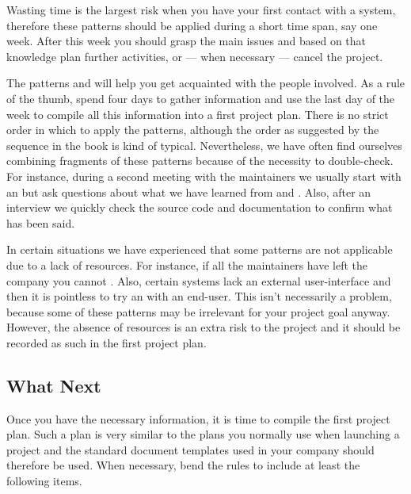 \documentclass[a4paper,10pt,twoside]{book}
\begin{document}
Wasting time is the largest risk when you have your first contact with a system, therefore these patterns should be applied during a short time span, say one week. After this week you should grasp the main issues and based on that knowledge plan further activities, or --- when necessary --- cancel the project.

The patterns  and  will help you get acquainted with the people involved. As a rule of the thumb, spend four days to gather information and use the last day of the week to compile all this information into a first project plan. There is no strict order in which to apply the patterns, although the order as suggested by the sequence in the book is kind of typical. Nevertheless, we have often find ourselves combining fragments of these patterns because of the necessity to double-check. For instance, during a second meeting with the maintainers we usually start with an  but ask questions about what we have learned from  and . Also, after an interview we quickly check the source code and documentation to confirm what has been said.

In certain situations we have experienced that some patterns are not applicable due to a lack of resources. For instance, if all the maintainers have left the company you cannot . Also, certain systems lack an external user-interface and then it is pointless to try an  with an end-user. This isn't necessarily a problem, because some of these patterns may be irrelevant for your project goal anyway. However, the absence of resources is an extra risk to the project and it should be recorded as such in the first project plan.

\subsection*{What Next}

Once you have the necessary information, it is time to compile the first project plan. Such a plan is very similar to the plans you normally use when launching a project and the standard document templates used in your company should therefore be used. When necessary, bend the rules to include at least the following items.
\end{document}

